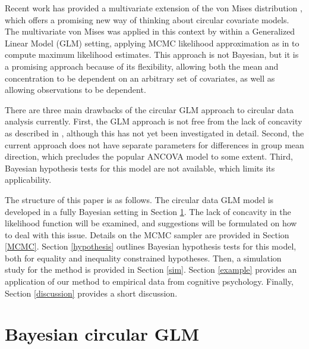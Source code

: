 Recent work has provided a multivariate extension of the von Mises distribution \citep{mardia2008multivariate,mardia2014some}, which offers a promising new way of thinking about circular covariate models. The multivariate von Mises was applied in this context by \citet{lagona2016regression} within a Generalized Linear Model (GLM) setting, applying MCMC likelihood approximation as in \citet{geyer1992constrained} to compute maximum likelihood estimates. This approach is not Bayesian, but it is a promising approach because of its flexibility, allowing both the mean and concentration to be dependent on an arbitrary set of covariates, as well as allowing observations to be dependent.

There are three main drawbacks of the circular GLM approach  to circular data analysis currently. First, the GLM approach is not free from the lack of concavity as described in \citet{gill2010}, although this has not yet been investigated in detail. Second, the current approach does not have separate parameters for differences in group mean direction, which precludes the popular ANCOVA model to some extent. Third, Bayesian hypothesis tests for this model are not available, which limits its applicability.

The structure of this paper is as follows. The circular data GLM model is developed in a fully Bayesian setting in Section \ref{themodel}. The lack of concavity in the likelihood function will be examined, and suggestions will be formulated on how to deal with this issue. Details on the MCMC sampler are provided in Section \ref{MCMC}. Section \ref{hypothesis} outlines Bayesian hypothesis tests for this model, both for equality and inequality constrained hypotheses. Then, a simulation study for the method is provided in Section \ref{sim}. Section \ref{example} provides an application of our method to empirical data from cognitive psychology. Finally, Section \ref{discussion} provides a short discussion.




\section{Bayesian circular GLM}

\label{themodel}

